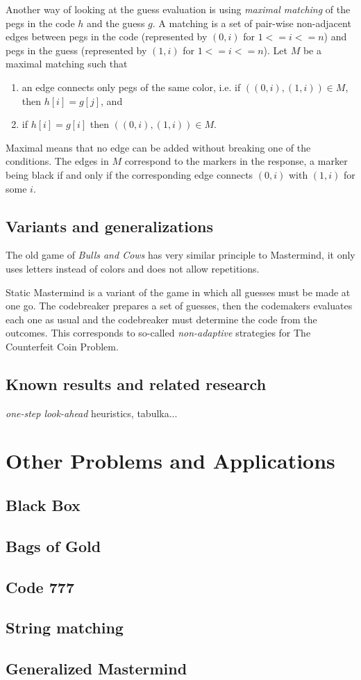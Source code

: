 Another way of looking at the guess evaluation is using
  \emph{maximal matching} of the pegs in the code $h$ and the guess $g$.
A matching is a set of pair-wise non-adjacent edges between
  pegs in the code (represented by $(0,i)$ for $1<=i<=n$) and
  pegs in the guess (represented by $(1,i)$ for $1<=i<=n$).
Let $M$ be a maximal matching such that
\begin{enumerate}
\item an edge connects only pegs of the same color, i.e. if $((0,i),(1,i))\in M$, then $h[i] = g[j]$, and
\item if $h[i] = g[i]$ then $((0,i),(1,i))\in M$.
\end{enumerate}
Maximal means that no edge can be added without breaking one of the conditions.
The edges in $M$ correspond to the markers in the response,
  a marker being black if and only if the corresponding edge connects $(0,i)$
  with $(1,i)$ for some $i$.

\subsection{Variants and generalizations}

The old game of \emph{Bulls and Cows} has very similar principle to Mastermind,
  it only uses letters instead of colors and does not allow repetitions.

Static Mastermind is a variant of the game in which all guesses
  must be made at one go.
The codebreaker prepares a set of guesses,
  then the codemakers evaluates each one as usual and
  the codebreaker must determine the code from the outcomes.
This corresponds to so-called \emph{non-adaptive} strategies
  for The Counterfeit Coin Problem.

\subsection{Known results and related research}

\emph{one-step look-ahead} heuristics, tabulka...


\section{Other Problems and Applications}
\subsection{Black Box}
\subsection{Bags of Gold}

\subsection{Code 777}

\subsection{String matching}

\subsection{Generalized Mastermind}


